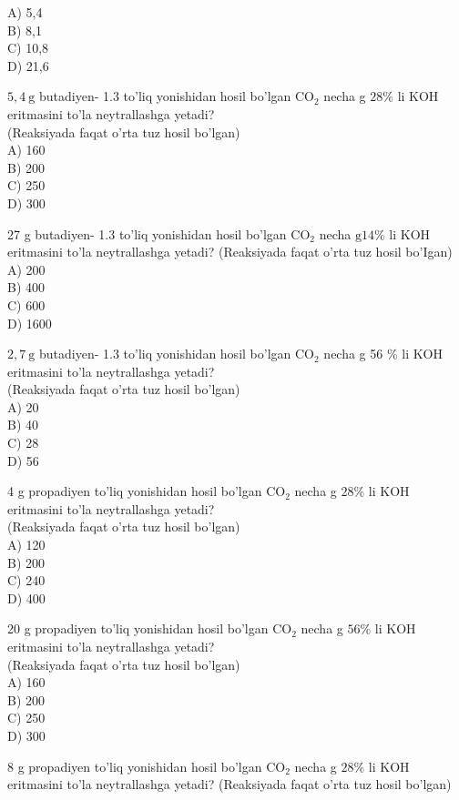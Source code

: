 A) 5,4\\
B) 8,1\\
C) 10,8\\
D) 21,6
  \item $5,4 \mathrm{~g}$ butadiyen- 1.3 to'liq yonishidan hosil bo'lgan $\mathrm{CO}_{2}$ necha g $28 \%$ li KOH eritmasini to'la neytrallashga yetadi?\\
(Reaksiyada faqat o'rta tuz hosil bo'lgan)\\
A) 160\\
B) 200\\
C) 250\\
D) 300
  \item 27 g butadiyen- 1.3 to'liq yonishidan hosil bo'lgan $\mathrm{CO}_{2}$ necha $\mathrm{g} 14 \%$ li KOH eritmasini to'la neytrallashga yetadi? (Reaksiyada faqat o'rta tuz hosil bo'Igan)\\
A) 200\\
B) 400\\
C) 600\\
D) 1600
  \item $2,7 \mathrm{~g}$ butadiyen- 1.3 to'liq yonishidan hosil bo'lgan $\mathrm{CO}_{2}$ necha g 56 \% li KOH eritmasini to'la neytrallashga yetadi?\\
(Reaksiyada faqat o'rta tuz hosil bo'lgan)\\
A) 20\\
B) 40\\
C) 28\\
D) 56
  \item 4 g propadiyen to'liq yonishidan hosil bo'lgan $\mathrm{CO}_{2}$ necha g $28 \%$ li KOH eritmasini to'la neytrallashga yetadi?\\
(Reaksiyada faqat o'rta tuz hosil bo'lgan)\\
A) 120\\
B) 200\\
C) 240\\
D) 400
  \item 20 g propadiyen to'liq yonishidan hosil bo'lgan $\mathrm{CO}_{2}$ necha g $56 \%$ li KOH eritmasini to'la neytrallashga yetadi?\\
(Reaksiyada faqat o'rta tuz hosil bo'lgan)\\
A) 160\\
B) 200\\
C) 250\\
D) 300
  \item 8 g propadiyen to'liq yonishidan hosil bo'lgan $\mathrm{CO}_{2}$ necha g $28 \%$ li KOH eritmasini to'la neytrallashga yetadi? (Reaksiyada faqat o'rta tuz hosil bo'lgan)\\
